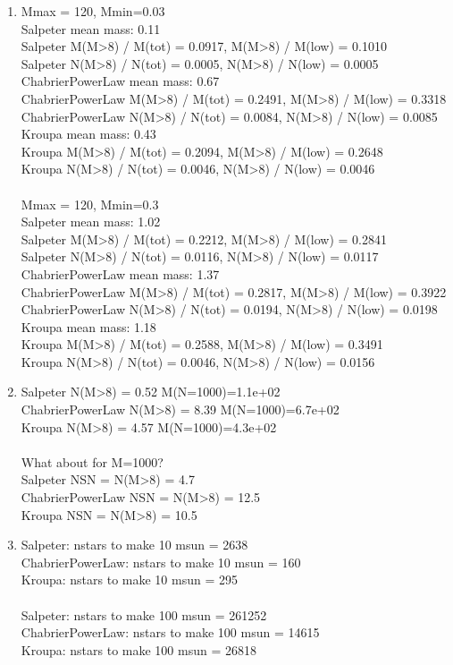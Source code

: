 \documentclass[twoside]{tufte-book} %
\begin{document}
\begin{enumerate}
\begin{enumerate}
\item %
    Mmax = 120, Mmin=0.03 \\
Salpeter mean mass: 0.11 \\
Salpeter M(M>8) / M(tot) = 0.0917, M(M>8) / M(low) = 0.1010 \\
Salpeter N(M>8) / N(tot) = 0.0005, N(M>8) / N(low) = 0.0005 \\
ChabrierPowerLaw mean mass: 0.67 \\
ChabrierPowerLaw M(M>8) / M(tot) = 0.2491, M(M>8) / M(low) = 0.3318 \\
ChabrierPowerLaw N(M>8) / N(tot) = 0.0084, N(M>8) / N(low) = 0.0085 \\
Kroupa mean mass: 0.43 \\
Kroupa M(M>8) / M(tot) = 0.2094, M(M>8) / M(low) = 0.2648 \\
Kroupa N(M>8) / N(tot) = 0.0046, N(M>8) / N(low) = 0.0046 \\
 \\
Mmax = 120, Mmin=0.3 \\
Salpeter mean mass: 1.02 \\
Salpeter M(M>8) / M(tot) = 0.2212, M(M>8) / M(low) = 0.2841 \\
Salpeter N(M>8) / N(tot) = 0.0116, N(M>8) / N(low) = 0.0117 \\
ChabrierPowerLaw mean mass: 1.37 \\
ChabrierPowerLaw M(M>8) / M(tot) = 0.2817, M(M>8) / M(low) = 0.3922 \\
ChabrierPowerLaw N(M>8) / N(tot) = 0.0194, N(M>8) / N(low) = 0.0198 \\
Kroupa mean mass: 1.18 \\
Kroupa M(M>8) / M(tot) = 0.2588, M(M>8) / M(low) = 0.3491 \\
Kroupa N(M>8) / N(tot) = 0.0046, N(M>8) / N(low) = 0.0156 

\item %
Salpeter          N(M>8) = 0.52  M(N=1000)=1.1e+02\\
ChabrierPowerLaw  N(M>8) = 8.39  M(N=1000)=6.7e+02\\
Kroupa            N(M>8) = 4.57  M(N=1000)=4.3e+02\\
\\
What about for M=1000? \\
Salpeter          NSN = N(M>8) = 4.7\\
ChabrierPowerLaw  NSN = N(M>8) = 12.5\\
Kroupa            NSN = N(M>8) = 10.5


\item %
Salpeter: nstars to make 10 msun = 2638\\
ChabrierPowerLaw: nstars to make 10 msun = 160\\
Kroupa: nstars to make 10 msun = 295\\
\\
Salpeter: nstars to make 100 msun = 261252\\
ChabrierPowerLaw: nstars to make 100 msun = 14615\\
Kroupa: nstars to make 100 msun = 26818


\end{enumerate}
\end{enumerate}
\end{document}
